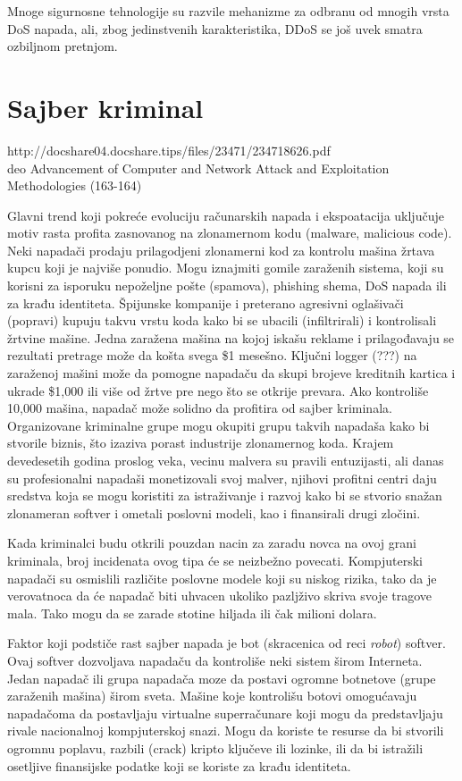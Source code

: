 \documentclass[a4paper]{article}
\begin{document}
Mnoge sigurnosne tehnologije su razvile mehanizme za odbranu od mnogih vrsta DoS napada, ali, zbog jedinstvenih karakteristika, DDoS se još uvek smatra ozbiljnom pretnjom.

\section{Sajber kriminal}
\label{sec:sajber_kriminal}

http://docshare04.docshare.tips/files/23471/234718626.pdf \\
deo Advancement of  Computer and Network Attack and Exploitation Methodologies (163-164)


Glavni trend koji pokreće evoluciju računarskih napada i ekspoatacija uključuje motiv rasta profita zasnovanog na zlonamernom kodu (malware, malicious code). Neki napadači prodaju prilagodjeni zlonamerni kod za kontrolu mašina žrtava kupcu koji je najviše ponudio. Mogu iznajmiti gomile zaraženih sistema, koji su korisni za isporuku nepoželjne pošte (spamova), phishing shema, DoS napada ili za krađu identiteta. Špijunske kompanije i preterano agresivni oglašivači (popravi) kupuju takvu vrstu koda kako bi se ubacili (infiltrirali) i kontrolisali žrtvine mašine. Jedna zaražena mašina na kojoj iskašu reklame i prilagođavaju se rezultati pretrage može da košta svega \$1 mesešno. Ključni logger (???) na zaraženoj mašini može da pomogne napadaču da skupi brojeve kreditnih kartica i ukrade \$1,000 ili više od žrtve pre nego što se otkrije prevara. Ako kontroliše 10,000 mašina, napadač može solidno da profitira od sajber kriminala. Organizovane kriminalne grupe mogu okupiti grupu takvih napadaša kako bi stvorile biznis, što izaziva porast industrije zlonamernog koda. Krajem devedesetih godina proslog veka, vecinu malvera su pravili entuzijasti, ali danas su profesionalni napadaši monetizovali svoj malver, njihovi profitni centri daju sredstva koja se mogu koristiti za istraživanje i razvoj kako bi se stvorio snažan zlonameran softver i ometali poslovni modeli, kao i finansirali drugi zločini. 

Kada kriminalci budu otkrili pouzdan nacin za zaradu novca na ovoj grani kriminala, broj incidenata ovog tipa će se neizbežno povecati. Kompjuterski napadači su osmislili različite poslovne modele koji su niskog rizika, tako da je verovatnoca da će napadač biti uhvacen ukoliko pazljživo skriva svoje tragove mala. Tako mogu da se zarade stotine hiljada ili čak milioni dolara.

Faktor koji podstiče rast sajber napada je bot (skracenica od reci \textit{robot}) softver. Ovaj softver dozvoljava napadaču da kontroliše neki sistem širom Interneta. Jedan napadač ili grupa napadača moze da postavi ogromne botnetove (grupe zaraženih mašina) širom sveta. Mašine koje kontrolišu botovi omogućavaju napadačoma da postavljaju virtualne superračunare koji mogu da predstavljaju rivale nacionalnoj kompjuterskoj snazi. Mogu da koriste te resurse da bi stvorili ogromnu poplavu, razbili (crack) kripto ključeve ili lozinke, ili da bi istražili osetljive finansijske podatke koji se koriste za krađu identiteta.
\end{document}
